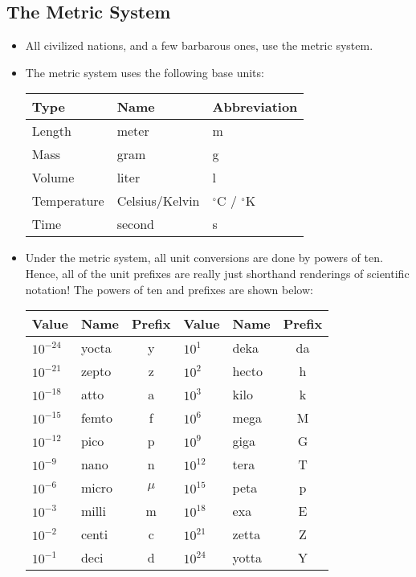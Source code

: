\documentclass{article}
\begin{document}
\subsection*{The Metric System}
\begin{itemize}
\item All civilized nations, and a few barbarous ones, use the metric system.
\item The metric system uses the following base units:\newline
\begin{tabular}{|l|l|l|}
\hline
{\bf Type} & {\bf Name} & {\bf Abbreviation} \\
\hline
Length & meter & m \\
\hline
Mass & gram & g \\
\hline
Volume & liter & l \\
\hline
Temperature & Celsius/Kelvin & $^{\circ}$C / $^{\circ}$K\\
\hline
Time & second & s \\
\hline
\end{tabular}

\item Under the metric system, all unit conversions are done
by powers of ten.  Hence, all of the unit prefixes are really
just shorthand renderings of scientific notation! The powers of
ten and prefixes are shown below:\newline

\begin{tabular}{|l|l|c||l|l|c|}
\hline
{\bf Value} & {\bf Name} & {\bf Prefix} & {\bf Value} & {\bf Name} & {\bf Prefix} \\
\hline
$10^{-24}$ & yocta & y & $10^1$ & deka & da\\
\hline
$10^{-21}$ & zepto & z & $10^2$ & hecto & h\\
\hline
$10^{-18}$ & atto & a & $10^3$ & kilo & k\\
\hline
$10^{-15}$ & femto & f & $10^6$ & mega & M\\
\hline
$10^{-12}$ & pico & p & $10^9$ & giga & G\\
\hline
$10^{-9}$ & nano & n & $10^{12}$ & tera & T \\
\hline
$10^{-6}$ & micro & $\mu$ & $10^{15}$ & peta & p\\
\hline
$10^{-3}$ & milli & m & $10^{18}$ & exa & E\\
\hline
$10^{-2}$ & centi & c & $10^{21}$ & zetta & Z\\
\hline
$10^{-1}$ & deci & d & $10^{24}$ & yotta & Y\\
\hline
\end{tabular}

\end{itemize}
\end{document}
